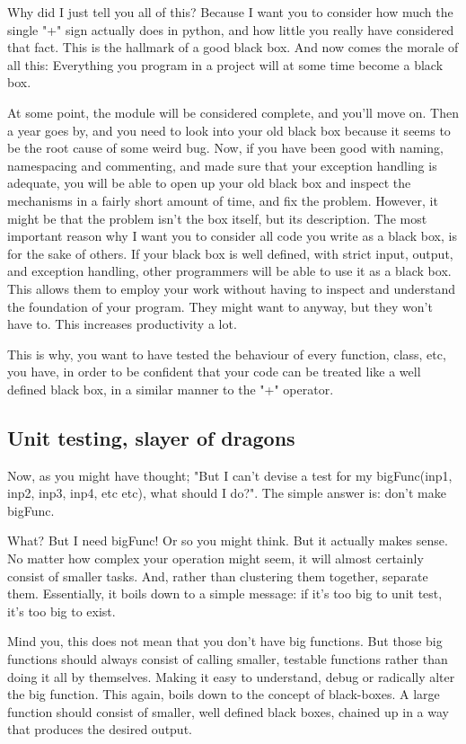 \documentclass[10pt,a4paper]{article}
\begin{document}
Why did I just tell you all of this? Because I want you to consider how much the single "+" sign actually does in python, and how little you really have considered that fact. This is the hallmark of a good black box. And now comes the morale of all this: Everything you program in a project will at some time become a black box. 

At some point, the module will be considered complete, and you'll move on. Then a year goes by, and you need to look into your old black box because it seems to be the root cause of some weird bug. Now, if you have been good with naming, namespacing and commenting, and made sure that your exception handling is adequate, you will be able to open up your old black box and inspect the mechanisms in a fairly short amount of time, and fix the problem. However, it might be that the problem isn't the box itself, but its description. The most important reason why I want you to consider all code you write as a black box, is for the sake of others. If your black box is well defined, with strict input, output, and exception handling, other programmers will be able to use it as a black box. This allows them to employ your work without having to inspect and understand the foundation of your program. They might want to anyway, but they won't have to. This increases productivity a lot. 

This is why, you want to have tested the behaviour of every function, class, etc, you have, in order to be confident that your code can be treated like a well defined black box, in a similar manner to the "+" operator. 

\subsection{Unit testing, slayer of dragons}
Now, as you might have thought; "But I can't devise a test for my bigFunc(inp1, inp2, inp3, inp4, etc etc), what should I do?". The simple answer is: don't make bigFunc.

What? But I need bigFunc! Or so you might think. But it actually makes sense. No matter how complex your operation might seem, it will almost certainly consist of smaller tasks. And, rather than clustering them together, separate them. Essentially, it boils down to a simple message: if it's too big to unit test, it's too big to exist.

Mind you, this does not mean that you don't have big functions. But those big functions should always consist of calling smaller, testable functions rather than doing it all by themselves. Making it easy to understand, debug or radically alter the big function. This again, boils down to the concept of black-boxes. A large function should consist of smaller, well defined black boxes, chained up in a way that produces the desired output. 
\end{document}
